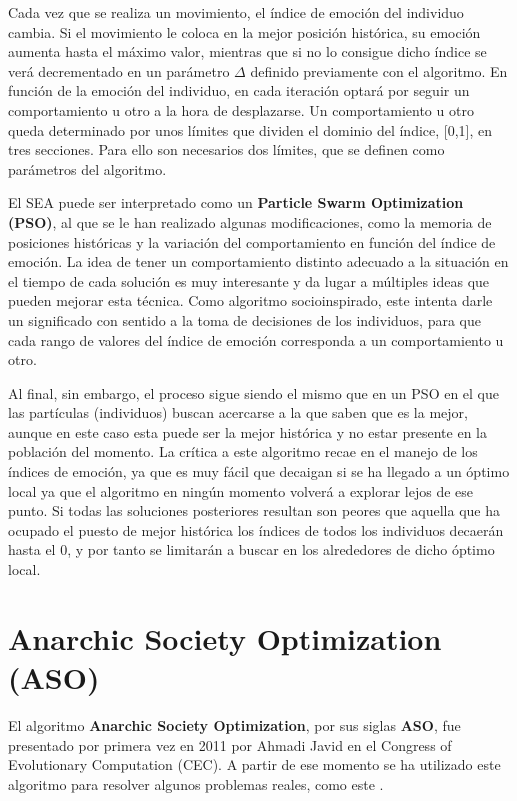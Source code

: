 Cada vez que se realiza un movimiento, el índice de emoción del individuo cambia. Si el movimiento le coloca en la mejor posición histórica, su emoción aumenta hasta el máximo valor, mientras que si no lo consigue dicho índice se verá decrementado en un parámetro $\Delta$ definido previamente con el algoritmo. En función de la emoción del individuo, en cada iteración optará por seguir un comportamiento u otro a la hora de desplazarse. Un comportamiento u otro queda determinado por unos límites que dividen el dominio del índice, [0,1], en tres secciones. Para ello son necesarios dos límites, que se definen como parámetros del algoritmo.

El SEA puede ser interpretado como un \textbf{Particle Swarm Optimization (PSO)}, al que se le han realizado algunas modificaciones, como la memoria de posiciones históricas y la variación del comportamiento en función del índice de emoción. La idea de tener un comportamiento distinto adecuado a la situación en el tiempo de cada solución es muy interesante y da lugar a múltiples ideas que pueden mejorar esta técnica. Como algoritmo socioinspirado, este intenta darle un significado con sentido a la toma de decisiones de los individuos, para que cada rango de valores del índice de emoción corresponda a un comportamiento u otro.

Al final, sin embargo, el proceso sigue siendo el mismo que en un PSO en el que las partículas (individuos) buscan acercarse a la que saben que es la mejor, aunque en este caso esta puede ser la mejor histórica y no estar presente en la población del momento. La crítica a este algoritmo recae en el manejo de los índices de emoción, ya que es muy fácil que decaigan si se ha llegado a un óptimo local ya que el algoritmo en ningún momento volverá a explorar lejos de ese punto. Si todas las soluciones posteriores resultan son peores que aquella que ha ocupado el puesto de mejor histórica los índices de todos los individuos decaerán hasta el 0, y por tanto se limitarán a buscar en los alrededores de dicho óptimo local.

\section{Anarchic Society Optimization (ASO)}

El algoritmo \textbf{Anarchic Society Optimization}, por sus siglas \textbf{ASO}, fue presentado por primera vez en 2011 por Ahmadi Javid \cite{aso-conference} en el Congress of Evolutionary Computation (CEC). A partir de ese momento se ha utilizado este algoritmo para resolver algunos problemas reales, como este \cite{aso-article}.

